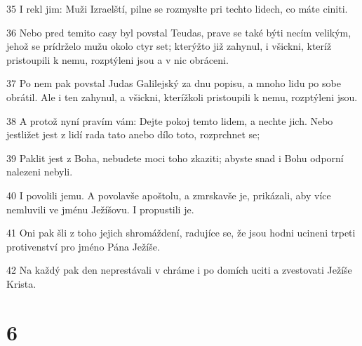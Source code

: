 \par 35 I rekl jim: Muži Izraelští, pilne se rozmyslte pri techto lidech, co máte ciniti.
\par 36 Nebo pred temito casy byl povstal Teudas, prave se také býti necím velikým, jehož se prídrželo mužu okolo ctyr set; kterýžto již zahynul, i všickni, kteríž pristoupili k nemu, rozptýleni jsou a v nic obráceni.
\par 37 Po nem pak povstal Judas Galilejský za dnu popisu, a mnoho lidu po sobe obrátil. Ale i ten zahynul, a všickni, kterížkoli pristoupili k nemu, rozptýleni jsou.
\par 38 A protož nyní pravím vám: Dejte pokoj temto lidem, a nechte jich. Nebo jestližet jest z lidí rada tato anebo dílo toto, rozprchnet se;
\par 39 Paklit jest z Boha, nebudete moci toho zkaziti; abyste snad i Bohu odporní nalezeni nebyli.
\par 40 I povolili jemu. A povolavše apoštolu, a zmrskavše je, prikázali, aby více nemluvili ve jménu Ježíšovu. I propustili je.
\par 41 Oni pak šli z toho jejich shromáždení, radujíce se, že jsou hodni ucineni trpeti protivenství pro jméno Pána Ježíše.
\par 42 Na každý pak den neprestávali v chráme i po domích uciti a zvestovati Ježíše Krista.

\chapter{6}

